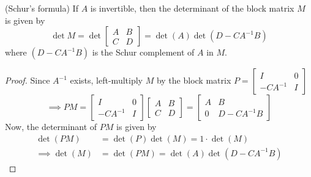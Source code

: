 \begin{lemma}
    (Schur's formula)
    If \( A \) is invertible, then the determinant of the block matrix \( M \) is given by
    \begin{equation*}
        \det M
        =
        \det
        \begin{bmatrix}
            A & B \\
            C & D
        \end{bmatrix}
        =
        \det(A)\det \left(D-CA^{-1}B\right)
    \end{equation*}
    where \( \left(D-CA^{-1}B\right) \) is the Schur complement of \( A \) in \( M \).
\end{lemma}
\begin{proof}
    Since \( A^{-1} \) exists, left-multiply \( M \) by the block matrix
    \(
    P = \begin{bmatrix}
        I        & 0 \\
        -CA^{-1} & I
    \end{bmatrix}
    \)
    \[
        \implies
        PM
        =
        \begin{bmatrix}
            I        & 0 \\
            -CA^{-1} & I
        \end{bmatrix}
        \begin{bmatrix}
            A & B \\
            C & D
        \end{bmatrix}
        =
        \begin{bmatrix}
            A & B            \\
            0 & D - CA^{-1}B
        \end{bmatrix}
    \]
    Now, the determinant of \( PM \) is given by
    \begin{align*}
        \det(PM)
         & =
        \det(P)\det(M)
        =
        1 \cdot \det(M)
        \\
        \implies
        \det(M)
         & =
        \det(PM)
        =
        \det(A) \det(D - CA^{-1}B)
    \end{align*}
\end{proof}

